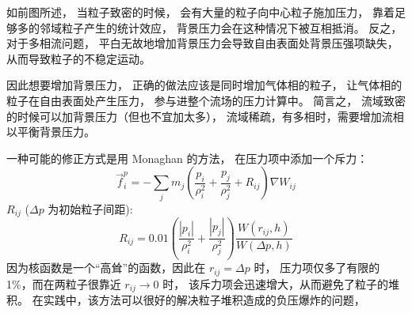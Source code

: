 \begin{frame}
    如前图所述，
    当粒子致密的时候，
    会有大量的粒子向中心粒子施加压力，
    靠着足够多的邻域粒子产生的统计效应，
    背景压力会在这种情况下被互相抵消。
    反之，对于多相流问题，
    平白无故地增加背景压力会导致自由表面处背景压强项缺失，
    从而导致粒子的不稳定运动。
    \begin{figure}[H]
        \centering
    \end{figure}
    因此想要增加背景压力，
    正确的做法应该是同时增加气体相的粒子，
    让气体相的粒子在自由表面处产生压力，
    参与进整个流场的压力计算中。
    简言之，
    流域致密的时候可以加背景压力（但也不宜加太多），
    流域稀疏，有多相时，需要增加流相以平衡背景压力。
\end{frame}

\begin{frame}
    一种可能的修正方式是用 Monaghan 的方法，
    在压力项中添加一个斥力：
    \begin{equation}
        \vec{f}_i^p = 
        -\sum_j 
        m_j 
        \left(
            \frac{p_i}{\rho_i^2} + \frac{p_j}{\rho_j^2} + R_{ij}
        \right)\nabla W_{ij}
    \end{equation}
    $R_{ij}$ ($\Delta p$ 为初始粒子间距):
    \begin{equation}
        R_{ij} = 
        0.01
        \left(
            \frac{|p_i|}{\rho_i^2} + \frac{|p_j|}{\rho_j^2}
        \right)
        \frac{W(r_{ij}, h)}{W(\Delta p, h)}
    \end{equation}
    因为核函数是一个“高耸”的函数，因此在 $r_{ij}=\Delta p$ 时，
    压力项仅多了有限的 1\%，而在两粒子很靠近 $r_{ij}\to 0$ 时，
    该斥力项会迅速增大，从而避免了粒子的堆积。
    在实践中，该方法可以很好的解决粒子堆积造成的负压爆炸的问题， 
\end{frame}

